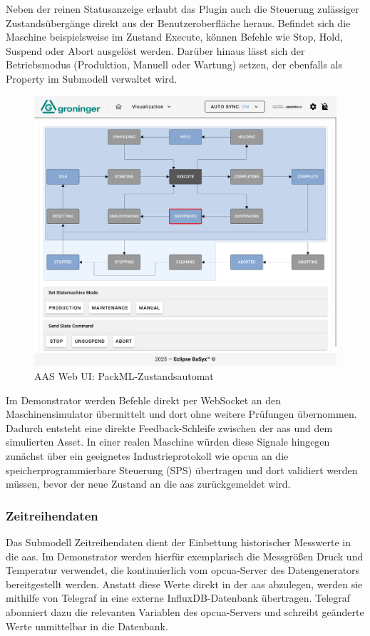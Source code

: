 Neben der reinen Statusanzeige erlaubt das Plugin auch die Steuerung zulässiger Zustandsübergänge direkt aus der Benutzeroberfläche heraus.
Befindet sich die Maschine beispielsweise im Zustand Execute, können Befehle wie Stop, Hold, Suspend oder Abort ausgelöst werden.
Darüber hinaus lässt sich der Betriebsmodus (Produktion, Manuell oder Wartung) setzen, der ebenfalls als Property im Submodell verwaltet wird.

\newpage
\begin{figure}[htbp]
    \centering 
    \includegraphics[width=1\textwidth]{Bilder/ErgebnisseAASWebUI/Kontrollkomponente.png} 
    \caption{AAS Web UI: PackML-Zustandsautomat} 
    \label{fig:PackMLZustandsautomat} 
\end{figure}
\vspace{-0.5em}

Im Demonstrator werden Befehle direkt per WebSocket an den Maschinensimulator übermittelt und dort ohne weitere Prüfungen übernommen. 
Dadurch entsteht eine direkte Feedback-Schleife zwischen der \acs{aas} und dem simulierten Asset.
In einer realen Maschine würden diese Signale hingegen zunächst über ein geeignetes Industrieprotokoll wie \acs{opcua} an die speicherprogrammierbare Steuerung (SPS) übertragen und dort validiert werden müssen, bevor der neue Zustand an die \acs{aas} zurückgemeldet wird.

\subsubsection*{Zeitreihendaten}
Das Submodell Zeitreihendaten dient der Einbettung historischer Messwerte in die \acs{aas}. 
Im Demonstrator werden hierfür exemplarisch die Messgrößen Druck und Temperatur verwendet, die kontinuierlich vom \acs{opcua}-Server des Datengenerators bereitgestellt werden. 
Anstatt diese Werte direkt in der \acs{aas} abzulegen, werden sie mithilfe von Telegraf in eine externe InfluxDB-Datenbank übertragen. 
Telegraf abonniert dazu die relevanten Variablen des \acs{opcua}-Servers und schreibt geänderte Werte unmittelbar in die Datenbank.

